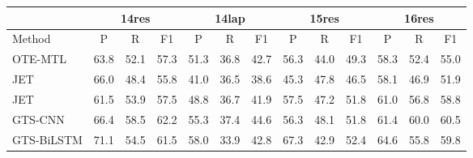 \documentclass[11pt]{article}
\begin{document}
\begin{table*}
	\centering
	\begin{tabular}{|l|lll|lll|lll|lll|}
		\hline
		& \multicolumn{3}{c|}{14res}                                              & \multicolumn{3}{c|}{14lap}                                              & \multicolumn{3}{c|}{15res}                                              & \multicolumn{3}{c|}{16res}                                              \\ \hline
		Method          & \multicolumn{1}{c}{P} & \multicolumn{1}{c}{R} & \multicolumn{1}{c|}{F1} & \multicolumn{1}{c}{P} & \multicolumn{1}{c}{R} & \multicolumn{1}{c|}{F1} & \multicolumn{1}{c}{P} & \multicolumn{1}{c}{R} & \multicolumn{1}{c|}{F1} & \multicolumn{1}{c}{P} & \multicolumn{1}{c}{R} & \multicolumn{1}{c|}{F1} \\
		OTE-MTL         & 63.8                  & 52.1                  & 57.3                    & 51.3                  & 36.8                  & 42.7                    & 56.3                  & 44.0                  & 49.3                    & 58.3                  & 52.4                  & 55.0                    \\
		JET         & 66.0                  & 48.4                  & 55.8                    & 41.0                  & 36.5                  & 38.6                    & 45.3                  & 47.8                  & 46.5                    & 58.1                  & 46.9                  & 51.9                    \\
		JET         & 61.5                  & 53.9                  & 57.5                    & 48.8                  & 36.7                  & 41.9                    & 57.5                  & 47.2                  & 51.8                    & 61.0                  & 56.8                  & 58.8                    \\
		GTS-CNN         & 66.4                  & 58.5                  & 62.2                    & 55.3                  & 37.4                  & 44.6                    & 56.3                  & 48.1                  & 51.8                    & 61.4                  & 60.0                  & 60.5                    \\
		GTS-BiLSTM      & 71.1                  & 54.5                  & 61.5                    & 58.0                  & 33.9                  & 42.8                    & 67.3                  & 42.9                  & 52.4                    & 64.6                  & 55.8                  & 59.8                    \\

\end{tabular}
\end{table*}
\end{document}
